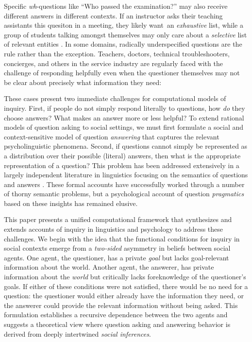 \documentclass[11pt, floatsintext]{apa6}
\begin{document}
Specific \emph{wh}-questions like ``Who passed the examination?'' may also receive different answers in different contexts. 
If an instructor asks their teaching assistants this quesiton in a meeting, they likely want an \emph{exhaustive} list, while a group of students talking amongst themselves may only care about a \emph{selective} list of relevant entities \cite{SchulzVanRooij06_ExhaustiveInterpretation}.
In some domains, radically underspecified questions are the rule rather than the exception. 
Teachers, doctors, technical troubleshooters, concierges, and others in the service industry are regularly faced with the challenge of responding helpfully even when the questioner themselves may not be clear about precisely what information they need:


These cases present two immediate challenges for computational models of inquiry. 
First, if people do not simply respond literally to questions, how \emph{do} they choose answers? 
What makes an answer more or less helpful?
To extend rational models of question asking to social settings, we must first formulate a social and context-sensitive model of question \emph{answering} that captures the relevant psycholinguistic phenomena.
Second, if questions cannot simply be represented as a distribution over their possible (literal) answers, then what is the appropriate representation of a question?
This problem has been addressed extensively in a largely independent literature in linguistics focusing on the semantics of questions and answers \cite{GroenendijkStokhof84_SemanticsOfQuestions,Ginzburg95_ResolvingQuestions,VanRooy03_QuestioningDecisionProblems,ciardelli2013inquisitive}. 
These formal accounts have successfully worked through a number of thorny semantic problems, but a psychological account of question \emph{pragmatics} based on these insights has remained elusive.

This paper presents a unified computational framework that synthesizes and extends accounts of inquiry in linguistics and psychology to address these challenges.
We begin with the idea that the functional conditions for inquiry in social contexts emerge from a \emph{two-sided} asymmetry in beliefs between social agents. 
One agent, the questioner, has a private \emph{goal} but lacks goal-relevant information about the world.
Another agent, the answerer, has private information about the \emph{world} but critically lacks foreknowledge of the questioner's goals.
If either of these conditions were not satisfied, there would be no need for a question: the questioner would either already have the information they need, or the answerer could provide the relevant information without being asked.
This formulation establishes a recursive dependence between the two agents and suggests a theoretical view where question asking and answering behavior is derived from deeply intertwined \emph{social inferences}.
\end{document}
